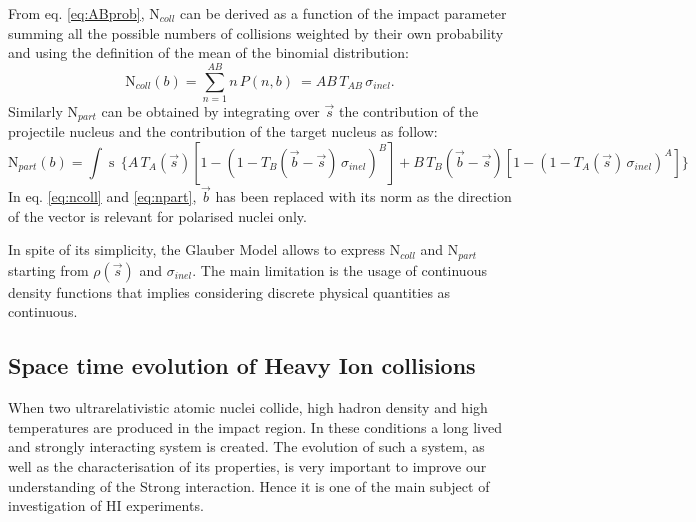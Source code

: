 From eq. \ref{eq:ABprob}, $\mathrm{N}_{coll}$ can be derived as a function of the impact parameter 
summing all the possible numbers of collisions weighted by their own probability and using the
definition of the mean of the binomial distribution:
\begin{equation} \label{eq:ncoll}
    \mathrm{N}_{coll}(b) = \sum_{n=1}^{AB} n\, P(n,b) \ = AB\, T_{AB}\, \sigma_{inel}.
\end{equation}
Similarly $\mathrm{N}_{part}$ can be obtained by integrating over $\vec{s}$ the contribution of the
projectile nucleus and the contribution of the target nucleus as follow:
\begin{equation} \label{eq:npart}
    \mathrm{N}_{part}(b) = \int \mathop{d^{2}s} \, \bigl\{ A\, T_{A}(\vec{s})[1-(1- T_{B}(\vec{b}-\vec{s})\, \sigma_{inel})^{B}
    ] + B\, T_{B}(\vec{b}-\vec{s}) [1-(1-T_{A}(\vec{s})\,\sigma_{inel})^{A}] \bigr\}
\end{equation}
In eq. \ref{eq:ncoll} and \ref{eq:npart}, $\vec{b}$ has been replaced with its norm as the direction 
of the vector is relevant for polarised nuclei only.

In spite of its simplicity, the Glauber Model allows to express $\mathrm{N}_{coll}$ and 
$\mathrm{N}_{part}$ starting from $\rho(\vec{s})$ and $\sigma_{inel}$. The main limitation
is the usage of continuous density functions that implies considering discrete physical quantities 
as continuous.

%
\subsection{Space time evolution of Heavy Ion collisions} \label{sec.1.3.2}

When two ultrarelativistic atomic nuclei collide, high hadron density and high temperatures
are produced in the impact region. 
In these conditions a long lived and strongly interacting system is created.
The evolution of such a system, as well as the characterisation of its properties, is very important
to improve our understanding of the Strong interaction. Hence it is one of the main subject of 
investigation of HI experiments.

